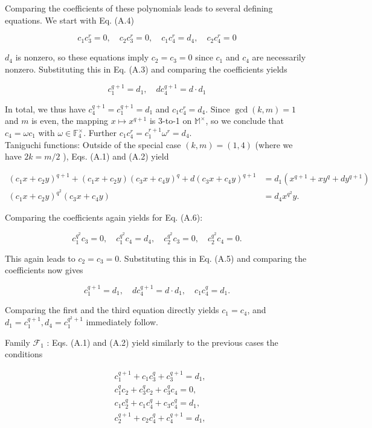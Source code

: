 \documentclass[10pt]{article}
\begin{document}
Comparing the coefficients of these polynomials leads to several defining equations. We start with Eq. (A.4)

$$
c_{1} c_{3}^{r}=0, \quad c_{2} c_{3}^{r}=0, \quad c_{1} c_{4}^{r}=d_{4}, \quad c_{2} c_{4}^{r}=0
$$

$d_{4}$ is nonzero, so these equations imply $c_{2}=c_{3}=0$ since $c_{1}$ and $c_{4}$ are necessarily nonzero. Substituting this in Eq. (A.3) and comparing the coefficients yields

$$
c_{1}^{q+1}=d_{1}, \quad d c_{4}^{q+1}=d \cdot d_{1}
$$

In total, we thus have $c_{4}^{q+1}=c_{1}^{q+1}=d_{1}$ and $c_{1} c_{4}^{r}=d_{4}$. Since $\operatorname{gcd}(k, m)=1$ and $m$ is even, the mapping $x \mapsto x^{q+1}$ is 3-to-1 on $\mathbb{M}^{\times}$, so we conclude that $c_{4}=\omega c_{1}$ with $\omega \in \mathbb{F}_{4}^{\times}$. Further $c_{1} c_{4}^{r}=c_{1}^{r+1} \omega^{r}=d_{4}$.\\
Taniguchi functions: Outside of the special case $(k, m)=(1,4)$ (where we have $2 k=m / 2$ ), Eqs. (A.1) and (A.2) yield


\begin{align*}
\left(c_{1} x+c_{2} y\right)^{q+1}+\left(c_{1} x+c_{2} y\right)\left(c_{3} x+c_{4} y\right)^{q}+d\left(c_{3} x+c_{4} y\right)^{q+1} & =d_{1}\left(x^{q+1}+x y^{q}+d y^{q+1}\right)  \tag{A.5}\\
\left(c_{1} x+c_{2} y\right)^{q^{2}}\left(c_{3} x+c_{4} y\right) & =d_{4} x^{q^{2}} y . \tag{A.6}
\end{align*}


Comparing the coefficients again yields for Eq. (A.6):

$$
c_{1}^{q^{2}} c_{3}=0, \quad c_{1}^{q^{2}} c_{4}=d_{4}, \quad c_{2}^{q^{2}} c_{3}=0, \quad c_{2}^{q^{2}} c_{4}=0 .
$$

This again leads to $c_{2}=c_{3}=0$. Substituting this in Eq. (A.5) and comparing the coefficients now gives

$$
c_{1}^{q+1}=d_{1}, \quad d c_{4}^{q+1}=d \cdot d_{1}, \quad c_{1} c_{4}^{q}=d_{1} .
$$

Comparing the first and the third equation directly yields $c_{1}=c_{4}$, and $d_{1}=c_{1}^{q+1}, d_{4}=c_{1}^{q^{2}+1}$ immediately follow.

Family $\mathcal{F}_{1}$ : Eqs. (A.1) and (A.2) yield similarly to the previous cases the conditions


\begin{align*}
& c_{1}^{q+1}+c_{1} c_{3}^{q}+c_{3}^{q+1}=d_{1},  \tag{A.7}\\
& c_{1}^{q} c_{2}+c_{3}^{q} c_{2}+c_{3}^{q} c_{4}=0,  \tag{A.12}\\
& c_{1} c_{2}^{q}+c_{1} c_{4}^{q}+c_{3} c_{4}^{q}=d_{1},  \tag{A.13}\\
& c_{2}^{q+1}+c_{2} c_{4}^{q}+c_{4}^{q+1}=d_{1},
\end{align*}
\end{document}
